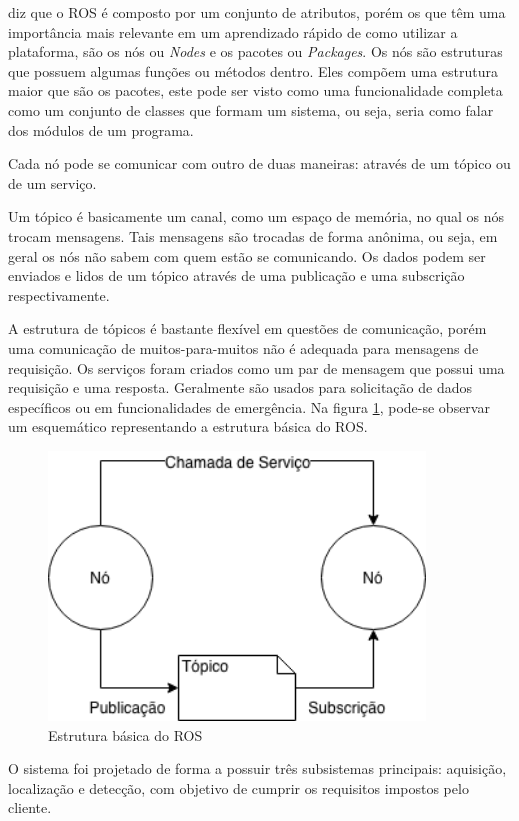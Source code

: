  diz que o ROS é composto por um conjunto de atributos, porém os que têm uma importância mais relevante em um aprendizado rápido de como utilizar a plataforma, são os nós ou \textit{Nodes} e os pacotes ou \textit{Packages}. Os nós são estruturas que possuem algumas funções ou métodos dentro. Eles compõem uma estrutura maior que são os pacotes, este pode ser visto como uma funcionalidade completa como um conjunto de classes que formam um sistema, ou seja, seria como falar dos módulos de um programa.

Cada nó pode se comunicar com outro de duas maneiras: através de um tópico ou de um serviço.

 Um tópico é basicamente um canal, como um espaço de memória, no qual os nós trocam mensagens. Tais mensagens são trocadas de forma anônima, ou seja, em geral os nós não sabem com quem estão se comunicando. Os dados podem ser enviados e lidos de um tópico através de uma publicação e uma subscrição respectivamente.

A estrutura de tópicos é bastante flexível em questões de comunicação, porém uma comunicação de muitos-para-muitos não é adequada para mensagens de requisição. Os serviços foram criados como um par de mensagem que possui uma requisição e uma resposta. Geralmente são usados para solicitação de dados específicos ou em funcionalidades de emergência. Na figura \ref{Fig:ros}, pode-se observar um esquemático representando a estrutura básica do ROS.

\begin{figure}[!ht]
\centering
\includegraphics[width=10cm]{Figures/ros.png}
\caption{Estrutura básica do ROS}\label{Fig:ros}
\end{figure}

O sistema foi projetado de forma a possuir três subsistemas principais: aquisição, localização e detecção, com objetivo de cumprir os requisitos impostos pelo cliente.

